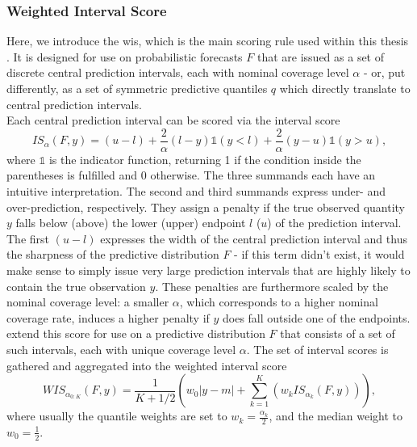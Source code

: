 \subsubsection{Weighted Interval Score} \label{ssub:weighted_interval_score}
Here, we introduce the \ac{wis}, which is the main scoring rule used within this thesis \cite{bracher_evaluating_2021}. It is designed for use on probabilistic forecasts \cite{european_covid-19_forecast_hub_european_2021} $F$ that are issued as a set of discrete central prediction intervals, each with nominal coverage level $\alpha$ - or, put differently, as a set of symmetric predictive quantiles $q$ which directly translate to central prediction intervals. \\
Each central prediction interval can be scored via the interval score \citep{gneiting_strictly_2007}
\begin{equation}
IS_{\alpha}(F, y) = (u-l) + \frac{2}{\alpha}(l - y)\mathbb{1}(y < l) + \frac{2}{\alpha}(y - u)\mathbb{1}(y > u),
\end{equation}
where $\mathbb{1}$ is the indicator function, returning 1 if the condition inside the parentheses is fulfilled and 0 otherwise. The three summands each have an intuitive interpretation. The second and third summands express under- and over-prediction, respectively. They assign a penalty if the true observed quantity $y$ falls below (above) the lower (upper) endpoint $l$ ($u$) of the prediction interval. The first $(u-l)$ expresses the width of the central prediction interval and thus the sharpness of the predictive distribution $F$ - if this term didn't exist, it would make sense to simply issue very large prediction intervals that are highly likely to contain the true observation $y$. These penalties are furthermore scaled by the nominal coverage level: a smaller $\alpha$, which corresponds to a higher nominal coverage rate, induces a higher penalty if $y$ does fall outside one of the endpoints. \\
\cite{bracher_evaluating_2021} extend this score for use on a predictive distribution $F$ that consists of a set of such intervals, each with unique coverage level $\alpha$. The set of interval scores is gathered and aggregated into the weighted interval score
\begin{equation}
WIS_{\alpha_{0:K}}(F,y) = \frac{1}{K + 1/2}\left(w_{0}|y-m| + \sum_{k=1}^{K}\left(w_k IS_{\alpha_{k}}(F, y)\right)\right),
\end{equation}
where usually the quantile weights are set to $w_k = \frac{\alpha_{k}}{2}$, and the median weight to $w_{0} = \frac{1}{2}$.\\
